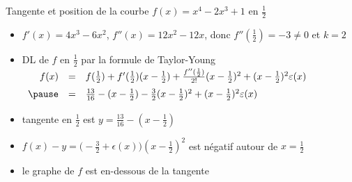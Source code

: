 \begin{frame}
\begin{exemple}
Tangente et position de la courbe $f(x)=x^4-2x^3+1$ en $\frac{1}{2}$
\pause
\begin{itemize}
  \item $f'(x)=4x^3-6x^2$, \pause $f''(x)=12x^2-12x$, donc $f''(\frac{1}{2}) = -3 \neq 0$ et $k=2$ 
\pause
  \item DL de $f$ en $\frac{1}{2}$ par la formule de Taylor-Young \pause
$\begin{array}{rcl@{\vrule depth 1.2ex height 3ex width 0mm }}
 f(x) 
& = & f(\frac12)+f'(\frac12)(x-\frac12)+\frac{f''(\frac12)}{2!}(x-\frac12)^2 +(x-\frac12)^2 \epsilon(x) \\ \pause
& = & \frac{13}{16} -(x- \frac12) -\frac{3}{2}(x-\frac12)^2 + (x-\frac12)^2 \epsilon(x) \\ 
 \end{array}$

\pause
  \item tangente en $\frac12$ est $y= \frac{13}{16} -(x- \frac12)$
\pause
  \item $f(x)-y =  \big(-\frac32 + \epsilon(x)\big)(x-\frac12)^2$ est négatif autour de $x=\frac12$
\pause
  \item le graphe de $f$ est en-dessous de la tangente
\end{itemize}
\end{exemple}
\end{frame}


\begin{frame}
\end{frame}


